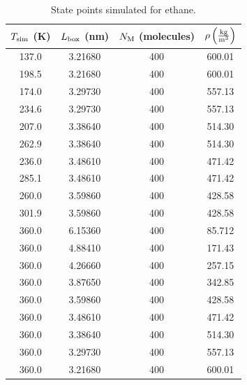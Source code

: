 \documentclass[journal=jctc,manuscript=article]{achemso}
\begin{document}
\begin{table}[p!]
	\caption{State points simulated for ethane.} \label{tab:Ethane state points}
	\begin{center}
		\begin{tabular}{|c|c|c|c|}
			\hline
			$T_{\rm sim}$ (K) & $L_{\rm box}$ (nm) & $N_{\rm M}$ (molecules) & $\rho \left(\frac{\rm kg}{\rm m^3}\right)$ \\ \hline
			137.0 & 3.21680 & 400 & 600.01 \\
			198.5 & 3.21680 & 400 & 600.01 \\ 
			174.0 & 3.29730 & 400 & 557.13 \\
			234.6 & 3.29730 & 400 & 557.13 \\
			207.0 & 3.38640 & 400 & 514.30 \\
			262.9 & 3.38640 & 400 & 514.30 \\
			236.0 & 3.48610 & 400 & 471.42 \\
			285.1 & 3.48610 & 400 & 471.42 \\
			260.0 & 3.59860 & 400 & 428.58 \\
			301.9 & 3.59860 & 400 & 428.58 \\
			360.0 & 6.15360 & 400 & 85.712 \\
			360.0 & 4.88410 & 400 & 171.43 \\
			360.0 & 4.26660 & 400 & 257.15 \\
			360.0 & 3.87650 & 400 & 342.85 \\
			360.0 & 3.59860 & 400 & 428.58 \\
			360.0 & 3.48610 & 400 & 471.42 \\
			360.0 & 3.38640 & 400 & 514.30 \\
			360.0 & 3.29730 & 400 & 557.13 \\
			360.0 & 3.21680 & 400 & 600.01 \\
			\hline
		\end{tabular}
	\end{center}
\end{table}
\end{document}
